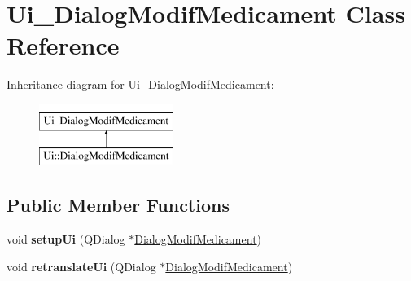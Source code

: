 \hypertarget{classUi__DialogModifMedicament}{\section{Ui\-\_\-\-Dialog\-Modif\-Medicament Class Reference}
\label{classUi__DialogModifMedicament}
}
Inheritance diagram for Ui\-\_\-\-Dialog\-Modif\-Medicament\-:\begin{figure}[H]
\begin{center}
\leavevmode
\includegraphics[height=2.000000cm]{classUi__DialogModifMedicament}
\end{center}
\end{figure}
\subsection*{Public Member Functions}
\begin{DoxyCompactItemize}
\item 
\hypertarget{classUi__DialogModifMedicament_adda744bc480f5d83abba8185ee817430}{void {\bfseries setup\-Ui} (Q\-Dialog $\ast$\hyperlink{classDialogModifMedicament}{Dialog\-Modif\-Medicament})}\label{classUi__DialogModifMedicament_adda744bc480f5d83abba8185ee817430}

\item 
\hypertarget{classUi__DialogModifMedicament_af2c1ddb1138afbaf6db6cde652fa2d95}{void {\bfseries retranslate\-Ui} (Q\-Dialog $\ast$\hyperlink{classDialogModifMedicament}{Dialog\-Modif\-Medicament})}\label{classUi__DialogModifMedicament_af2c1ddb1138afbaf6db6cde652fa2d95}

\end{DoxyCompactItemize}
